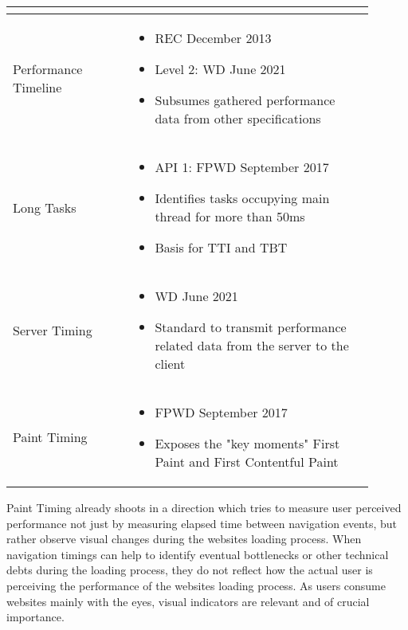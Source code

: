 \begin{center}
\begin{tabular}{ p{0.3\linewidth} | p{0.6\linewidth} }
\begin{itemize}[label={}, noitemsep,nolistsep, leftmargin=0cm]
	\end{itemize} \\  
	\hline
	Performance Timeline &
	\begin{itemize}[label={}, noitemsep,nolistsep, leftmargin=0cm]
		\item REC December 2013
		\item Level 2: WD June 2021
		\item Subsumes gathered performance data from other specifications
	\end{itemize} \\
	\hline
	Long Tasks &
	\begin{itemize}[label={}, noitemsep,nolistsep, leftmargin=0cm]
		\item API 1: FPWD  September 2017 
		\item Identifies tasks occupying main thread for more than 50ms
		\item Basis for TTI and TBT
	\end{itemize} \\	
	\hline
	Server Timing &
	\begin{itemize}[label={}, noitemsep,nolistsep, leftmargin=0cm]
		\item WD June 2021
		\item Standard to transmit performance related data from the server to the client
	\end{itemize} \\	
	\hline
	Paint Timing &
	\begin{itemize}[label={}, noitemsep,nolistsep, leftmargin=0cm]
		\item FPWD September 2017
		\item Exposes the "key moments" First Paint and First Contentful Paint
	\end{itemize} \\
	\end{tabular}
\end{center}



Paint Timing already shoots in a direction which tries to measure user perceived performance not just by measuring elapsed time between navigation events, but rather observe visual changes during the websites loading process.
When navigation timings can help to identify eventual bottlenecks or other technical debts during the loading process, they do not reflect how the actual user is perceiving the performance of the websites loading process.
As users consume websites mainly with the eyes, visual indicators are relevant and of crucial importance.

